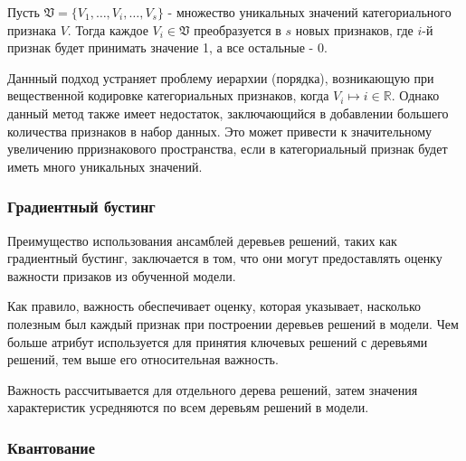 \documentclass[12pt]{article}
\begin{document}
    \par Пусть $ \mathfrak{V} = \{V_1, \ldots, V_i, \ldots, V_s\} $ - множество уникальных значений категориального признака $V$. Тогда каждое $V_i \in \mathfrak{V}$ преобразуется в $s$ новых признаков, где $i$-й признак будет принимать значение 1, а все остальные - 0. \\

    \par Даннный подход устраняет проблему иерархии (порядка), возникающую при вещественной кодировке категориальных признаков, когда $V_i \mapsto i \in \mathbb{R}$. Однако данный метод также имеет недостаток, заключающийся в добавлении большего количества признаков в набор данных. Это может привести к значительному увеличению прризнакового пространства, если в категориальный признак будет иметь много уникальных значений.

    
    \subsubsection{Градиентный бустинг}
    \label{sec:Research:FeatureSpace:GradientBoostingClassifier}

    \par Преимущество использования ансамблей деревьев решений, таких как градиентный бустинг, заключается в том, что они могут предоставлять оценку важности призаков из обученной модели. \\

    \par Как правило, важность обеспечивает оценку, которая указывает, насколько полезным был каждый признак при построении деревьев решений в модели. Чем больше атрибут используется для принятия ключевых решений с деревьями решений, тем выше его относительная важность. \\

    \par Важность рассчитывается для отдельного дерева решений, затем значения характеристик усредняются по всем деревьям решений в модели.

    \newpage
    

    \subsubsection{Квантование}
    \label{sec:Research:FeatureSpace:Quantile}
\end{document}
